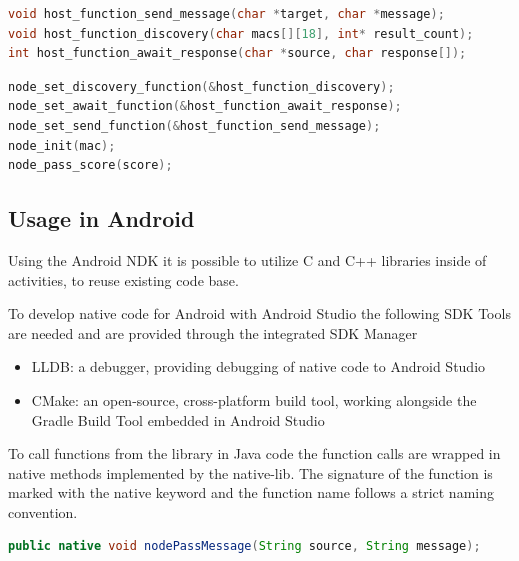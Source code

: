 \begin{lstlisting}[language=C, caption={Prototypes for host callbacks}, label={Prototypes for host callbacks}, float, floatplacement=H]
void host_function_send_message(char *target, char *message);
void host_function_discovery(char macs[][18], int* result_count);
int host_function_await_response(char *source, char response[]);
\end{lstlisting}

\begin{lstlisting}[language=C, caption={Node setup and system start}, label={Node setup and system start}, float, floatplacement=H]
node_set_discovery_function(&host_function_discovery);
node_set_await_function(&host_function_await_response);
node_set_send_function(&host_function_send_message);
node_init(mac);
node_pass_score(score);
\end{lstlisting}


\subsection{Usage in Android} \label{Usage in Android}
Using the Android \gls{NDK} it is possible to utilize C and C++ libraries inside of activities, to reuse existing code base.

To develop native code for Android with Android Studio the following \gls{SDK} Tools are needed and are provided through the integrated \gls{SDK} Manager

\begin{itemize}
	\item LLDB: a debugger, providing debugging of native code to Android Studio
	\item CMake: an open-source, cross-platform build tool, working alongside the Gradle Build Tool embedded in Android Studio 
\end{itemize} 

To call functions from the library in Java code the function calls are wrapped in native methods implemented by the native-lib. The signature of the function is marked with the native keyword and the function name follows a strict naming convention.

\begin{lstlisting}[language=Java, caption={Method signature in MainActivity.java}, label={Method signature in MainActivity.java}, float, floatplacement=H]
public native void nodePassMessage(String source, String message);
\end{lstlisting}

